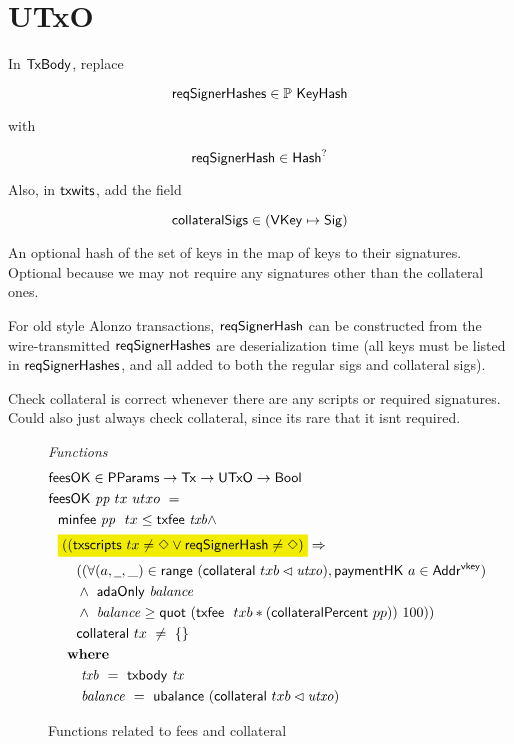 \section{UTxO}
\label{sec:utxo}

In $\mathsf{TxBody}$, replace

\[\mathsf{reqSignerHashes} \in \mathbb{P}~\mathsf{KeyHash} \]

with

\[ \mathsf{reqSignerHash} \in \mathsf{Hash}^? \]

Also, in $\mathsf{txwits}$, add the field

\[\mathsf{collateralSigs} \in (\mathsf{VKey} \mapsto \mathsf{Sig})\]

An optional hash of the set of keys in the map of keys to their signatures.
Optional because we may not require any signatures other than the collateral ones.

For old style Alonzo transactions,
$\mathsf{reqSignerHash}$ can be constructed from the wire-transmitted $\mathsf{reqSignerHashes}$
are deserialization time (all keys must be listed in $\mathsf{reqSignerHashes}$, and all
added to both the regular sigs and collateral sigs).

Check collateral is correct whenever there are any scripts or required signatures. Could also
just always check collateral, since its rare that it isnt required.

\begin{figure*}[htb]
  \emph{Functions}
  \begin{align*}
    & \fun{feesOK} \in \PParams \to \Tx \to \UTxO \to \Bool  \\
    & \fun{feesOK}~\var{pp}~tx~utxo~= \\
    &~~      \minfee{pp}~{tx} \leq \txfee{txb} \wedge \\
    &~~ \hldiff{((\fun{txscripts}~tx \neq \Nothing \vee \fun{reqSignerHash} \neq \Nothing)} \Rightarrow \\
    &~~~~~~((\forall (a, \wcard, \_) \in \fun{range}~(\fun{collateral}~{txb} \restrictdom \var{utxo}), \fun{paymentHK}~a \in \AddrVKey) \\
    &~~~~~~\wedge~ \fun{adaOnly}~\var{balance} \\
    &~~~~~~\wedge~ \var{balance} \geq \fun{quot}~(\txfee~{txb} * (\fun{collateralPercent}~pp))~100)) \\
    &~~~~~~\fun{collateral}~{tx}~ \neq~\{\} \\
    &~~      \where \\
    & ~~~~~~~ \var{txb}~=~\txbody{tx} \\
    & ~~~~~~~ \var{balance}~=~\fun{ubalance}~(\fun{collateral}~{txb} \restrictdom \var{utxo})
  \end{align*}
  \caption{Functions related to fees and collateral}
  \label{fig:functions:utxo}
\end{figure*}

